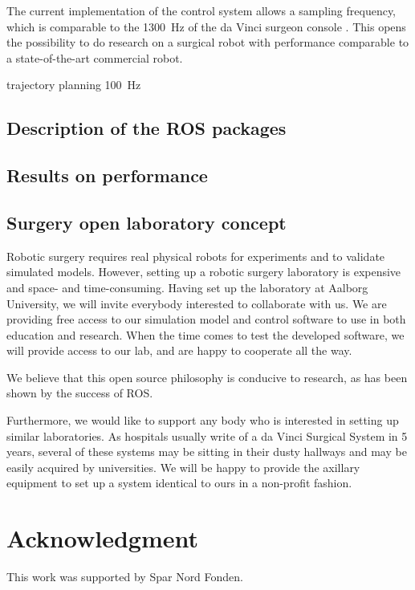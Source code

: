 \documentclass[a4paper, 10 pt, conference]{ieeeconf}      %
\begin{document}
The current implementation of the control system allows a sampling frequency, which is comparable to the 1300~Hz of the da Vinci
surgeon console \cite{faust2007robotics}. This opens the possibility to do research on a surgical robot with performance comparable to a state-of-the-art commercial robot.

trajectory planning 100~Hz





%

\subsection{Description of the ROS packages}

\subsection{Results on performance}

\subsection{Surgery open laboratory concept}
Robotic surgery requires real physical robots for experiments and to validate simulated models.
However, setting up a robotic surgery laboratory is expensive and space- and time-consuming.
Having set up the laboratory at Aalborg University, we will invite everybody interested to collaborate with us.
We are providing free access to our simulation model and control software to use in both education and research.
When the time comes to test the developed software, we will provide access to our lab, and are happy to cooperate all the way.

We believe that this open source philosophy is conducive to research, as has been shown by the success of ROS.

Furthermore, we would like to support any body who is interested in setting up similar laboratories.
As hospitals usually write of a da Vinci Surgical System in 5 years, several of these systems may be sitting in their dusty hallways and may be easily acquired by universities.
We will be happy to provide the axillary equipment to set up a system identical to ours in a non-profit fashion.

\section*{Acknowledgment}
This work was supported by Spar Nord Fonden.



\end{document}
